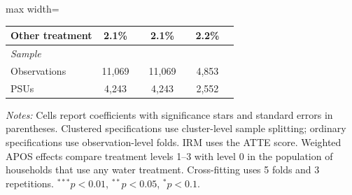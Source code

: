 \begin{table}[htbp]
\begin{adjustbox}{max width=\linewidth}
\begin{tabular}{lcccccc}
Other treatment & 2.1\% &  & 2.1\% &  & 2.2\% &  \\
\midrule
\multicolumn{7}{l}{\textit{Sample}} \\
Observations & 11,069 &  & 11,069 &  & 4,853 &  \\
PSUs & 4,243 &  & 4,243 &  & 2,552 &  \\
\hline\hline
\end{tabular}
\end{adjustbox}
\par\vspace{3pt}
\begin{minipage}{\linewidth}\scriptsize \textit{Notes:} Cells report coefficients with significance stars and standard errors in parentheses. Clustered specifications use cluster-level sample splitting; ordinary specifications use observation-level folds. IRM uses the ATTE score. Weighted APOS effects compare treatment levels 1--3 with level 0 in the population of households that use any water treatment. Cross-fitting uses 5 folds and 3 repetitions. $^{***}p<0.01$, $^{**}p<0.05$, $^{*}p<0.1$.\end{minipage}
\end{table}